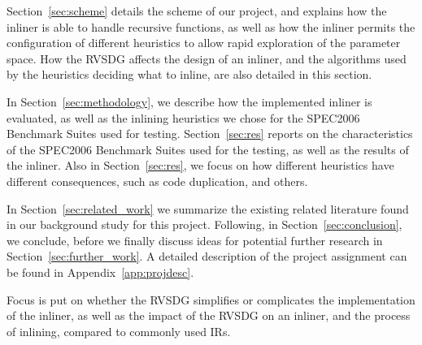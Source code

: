 Section~\ref{sec:scheme} details the scheme of our project, and explains how the
inliner is able to handle recursive functions, as well as how the inliner
permits the configuration of different heuristics to allow rapid exploration of
the parameter space. How the RVSDG affects the design of an inliner, and the
algorithms used by the heuristics deciding what to inline, are also detailed in
this section.

In Section~\ref{sec:methodology}, we describe how the implemented inliner is
evaluated, as well as the inlining heuristics we chose for the SPEC2006
Benchmark Suites used for testing. Section~\ref{sec:res} reports on the
characteristics of the SPEC2006 Benchmark Suites used for the testing, as well
as the results of the inliner. Also in Section~\ref{sec:res}, we focus on how
different heuristics have different consequences, such as code duplication, and
others.

In Section~\ref{sec:related_work} we summarize the existing related literature
found in our background study for this project. Following, in
Section~\ref{sec:conclusion}, we conclude, before we finally discuss ideas for
potential further research in Section~\ref{sec:further_work}. A detailed
description of the project assignment can be found in
Appendix~\ref{app:projdesc}.


Focus is put on whether the RVSDG simplifies or complicates the implementation
of the inliner, as well as the impact of the RVSDG on an inliner, and the
process of inlining, compared to commonly used IRs.
